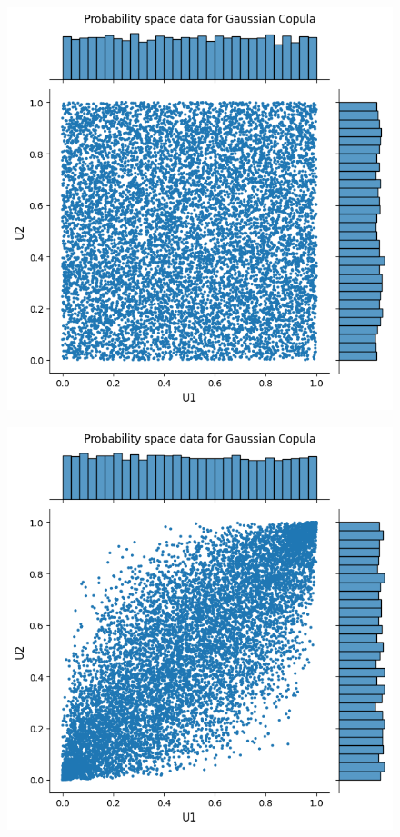 \begin{figure}
\begin{minipage}{0.4\textwidth}
        \label{fig:CorrelatedScatter}
    \end{minipage}
    \vfill
    \begin{minipage}{0.4\textwidth}
        \centering
        \includegraphics[width=\textwidth]{3Theory/pictures/IndependentProbSpace.png}
        \label{fig:UncorrelatedUniformScatter}
    \end{minipage}
    \hfill
    \begin{minipage}{0.4\textwidth}
        \centering
        \includegraphics[width=\textwidth]{3Theory/pictures/GaussianProbScatter.png}

\end{minipage}
\end{figure}
